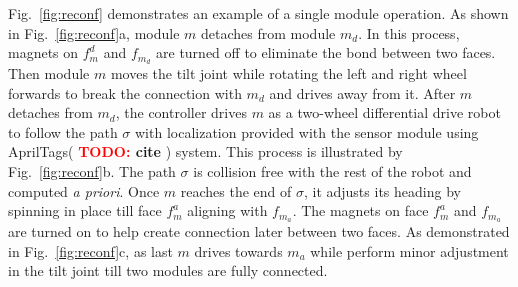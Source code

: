 \documentclass[conference]{IEEEtran}
\newcommand{\TODO}[1]{ {\bf \textcolor{red}{TODO:} #1 }}
\begin{document}
Fig.~\ref{fig:reconf} demonstrates an example of a single module operation.
As shown in Fig.~\ref{fig:reconf}a, module $m$ detaches from module $m_d$.
In this process, magnets on $f_m^d$ and $f_{m_d}$ are turned off to eliminate the bond between two faces.
Then module $m$ moves the tilt joint while rotating the left and right wheel forwards to break the connection with $m_d$ and drives away from it.
After $m$ detaches from $m_d$, the controller drives $m$ as a two-wheel differential drive robot to follow the path $\sigma$ with localization provided with the sensor module using AprilTags(\TODO{cite}) system. This process is illustrated by Fig.~\ref{fig:reconf}b.
The path $\sigma$ is collision free with the rest of the robot and computed \textit{a priori}. 
Once $m$ reaches the end of $\sigma$, it adjusts its heading by spinning in place till face $f_m^a$ aligning with $f_{m_a}$.
The magnets on face $f_m^a$ and $f_{m_a}$ are turned on to help create connection later between two faces.
As demonstrated in Fig.~\ref{fig:reconf}c, as last $m$ drives towards $m_a$ while perform minor adjustment in the tilt joint till two modules are fully connected.
\end{document}
